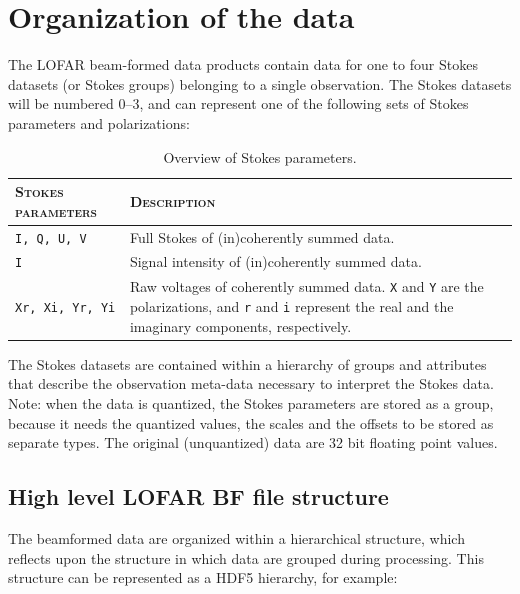 \documentclass[a4paper,10pt,bibtotoc]{scrartcl}
\begin{document}


\section{Organization of the data}
\label{sec:organization of the data}
The LOFAR beam-formed data products contain data for one to four Stokes datasets (or Stokes groups) belonging to a single observation. The Stokes datasets will be numbered 0--3, and can represent one of the following sets of Stokes parameters and polarizations:

\begin{table}[ht]
  \centering
  \begin{tabular}{|lp{10cm}|}
    \hline
    \textsc{Stokes parameters} & \textsc{Description} \\
    \hline \hline
    \verb|I, Q, U, V|     & Full Stokes of (in)coherently summed data. \\
    \verb|I|              & Signal intensity of (in)coherently summed data. \\
    \verb|Xr, Xi, Yr, Yi| & Raw voltages of coherently summed data. \verb|X| and \verb|Y| are the polarizations, and \verb|r| and \verb|i| represent the real and the imaginary components, respectively. \\
    \hline
  \end{tabular}
  \caption{Overview of Stokes parameters.}
  \label{tab:stokes}
\end{table}

The Stokes datasets are contained within a hierarchy of groups and attributes that describe the observation meta-data necessary to interpret the Stokes data. Note: when the data is quantized, the Stokes parameters are stored as a group, because it needs the quantized values, the scales and the offsets to be stored as separate types. The original (unquantized) data are 32 bit floating point values.

\subsection{High level LOFAR BF file structure}
\label{sec:High level LOFAR BF file structure}

The beamformed data are organized within a hierarchical structure,
which reflects upon the structure in which data are grouped during
processing.  This structure can be represented as a HDF5 hierarchy, for example:
\end{document}
